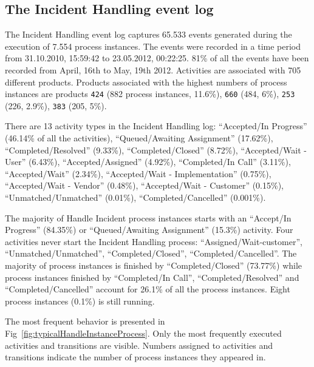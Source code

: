 \documentclass[lnbip]{svmultln}
\begin{document}
\subsection{The Incident Handling event log}

The Incident Handling event log captures 65.533 events generated during the execution of 7.554 process instances. The events were recorded in a time period from 31.10.2010, 15:59:42 to 23.05.2012, 00:22:25. 81\% of all the events have been recorded from April, 16th to May, 19th 2012. Activities are associated with 705 different products. Products associated with the highest numbers of process instances are products \texttt{424} (882 process instances, 11.6\%), \texttt{660} (484, 6\%), \texttt{253} (226, 2.9\%), \texttt{383} (205, 5\%).

There are 13 activity types in the Incident Handling log: ``Accepted/In Progress'' (46.14\% of all the activities), ``Queued/Awaiting Assignment'' (17.62\%), ``Completed/Resolved'' (9.33\%), ``Completed/Closed'' (8.72\%), ``Accepted/Wait - User'' (6.43\%), ``Accepted/Assigned'' (4.92\%), ``Completed/In Call'' (3.11\%), ``Accepted/Wait'' (2.34\%), ``Accepted/Wait - Implementation'' (0.75\%), ``Accepted/Wait - Vendor'' (0.48\%), ``Accepted/Wait - Customer'' (0.15\%), ``Unmatched/Unmatched'' (0.01\%), ``Completed/Cancelled'' (0.001\%).

The majority of Handle Incident process instances starts with an ``Accept/In Progress''  (84.35\%) or ``Queued/Awaiting Assignment'' (15.3\%) activity. Four activities never start the Incident Handling process: ``Assigned/Wait-customer'', ``Unmatched/Unmatched'', ``Completed/Closed'', ``Completed/Cancelled''. The majority of process instances is finished by ``Completed/Closed'' (73.77\%) while process instances finished by ``Completed/In Call'', ``Completed/Resolved'' and ``Completed/Cancelled'' account for 26.1\% of all the process instances. Eight process instances (0.1\%) is still running.

The most frequent behavior is presented in Fig~\ref{fig:typicalHandleInstanceProcess}. Only the most frequently executed activities and transitions are visible. Numbers assigned to activities and transitions indicate the number of process instances they appeared in.
\end{document}

